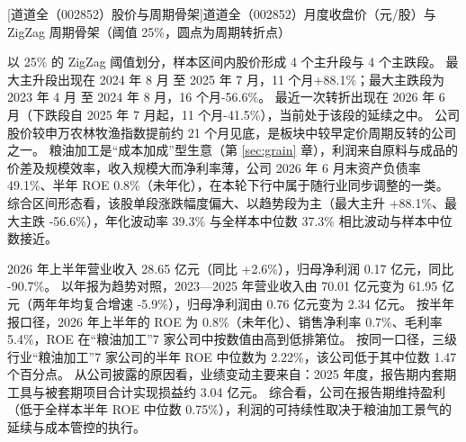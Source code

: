 \begin{center}
\begin{minipage}{\textwidth}\centering
{}

[道道全（002852）股价与周期骨架]{道道全（002852）月度收盘价（元/股）与 ZigZag 周期骨架（阈值 25\%，圆点为周期转折点）}
\end{minipage}
\end{center}

 以 25\% 的 ZigZag 阈值划分，样本区间内股价形成 4 个主升段与 4 个主跌段。 最大主升段出现在 2024 年 8 月 至 2025 年 7 月，11 个月+88.1\%；最大主跌段为 2023 年 4 月 至 2024 年 8 月，16 个月-56.6\%。 最近一次转折出现在 2026 年 6 月（下跌段自 2025 年 7 月起，11 个月-41.5\%），当前处于该段的延续之中。 公司股价较申万农林牧渔指数提前约 21 个月见底，是板块中较早定价周期反转的公司之一。 粮油加工是“成本加成”型生意（第 \ref{sec:grain} 章），利润来自原料与成品的价差及规模效率，收入规模大而净利率薄，公司 2026 年 6 月末资产负债率 49.1\%、半年 ROE 0.8\%（未年化），在本轮下行中属于随行业同步调整的一类。 综合区间形态看，该股单段涨跌幅度偏大、以趋势段为主（最大主升 +88.1\%、最大主跌 -56.6\%），年化波动率 39.3\% 与全样本中位数 37.3\% 相比波动与样本中位数接近。

 2026 年上半年营业收入 28.65 亿元（同比 +2.6\%），归母净利润 0.17 亿元，同比 -90.7\%。 以年报为趋势对照，2023---2025 年营业收入由 70.01 亿元变为 61.95 亿元（两年年均复合增速 -5.9\%），归母净利润由 0.76 亿元变为 2.34 亿元。 按半年报口径，2026 年上半年的 ROE 为 0.8\%（未年化）、销售净利率 0.7\%、毛利率 5.4\%，ROE 在“粮油加工”7 家公司中按数值由高到低排第位。 按同一口径，三级行业“粮油加工”7 家公司的半年 ROE 中位数为 2.22\%，该公司低于其中位数 1.47 个百分点。 从公司披露的原因看，业绩变动主要来自：2025 年度，报告期内套期工具与被套期项目合计实现损益约 3.04 亿元。 综合看，公司在报告期维持盈利（低于全样本半年 ROE 中位数 0.75\%），利润的可持续性取决于粮油加工景气的延续与成本管控的执行。

